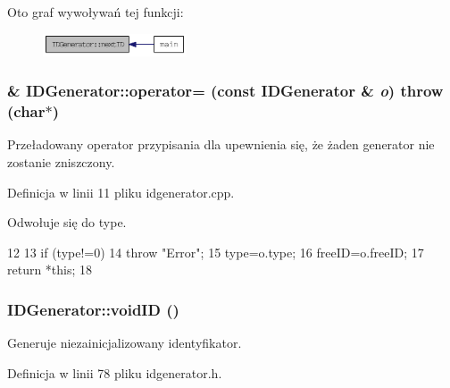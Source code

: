 Oto graf wywoływań tej funkcji:\nopagebreak
\begin{figure}[H]
\begin{center}
\leavevmode
\includegraphics[width=121pt]{classIDGenerator_a5e7eba106b14d8d09974bb6330476926_icgraph}
\end{center}
\end{figure}


\hypertarget{classIDGenerator_a1cead736be7f5fae000fe1c5f225234b}{
\subsubsection[{operator=}]{ \& IDGenerator::operator= (const {\bf IDGenerator} \& {\em o})  throw (char$\ast$)}}
\label{classIDGenerator_a1cead736be7f5fae000fe1c5f225234b}


Przeładowany operator przypisania dla upewnienia się, że żaden generator nie zostanie zniszczony. 



Definicja w linii 11 pliku idgenerator.cpp.



Odwołuje się do type.




\begin{DoxyCode}
12 {
13     if (type!=0)
14         throw "Error";
15     type=o.type;
16     freeID=o.freeID;
17     return *this;
18 }
\end{DoxyCode}


\hypertarget{classIDGenerator_ad5c8d7b639350d1f19dd990d850179c1}{
\subsubsection[{voidID}]{ IDGenerator::voidID ()}}
\label{classIDGenerator_ad5c8d7b639350d1f19dd990d850179c1}


Generuje niezainicjalizowany identyfikator. 



Definicja w linii 78 pliku idgenerator.h.




